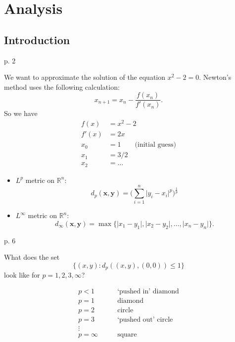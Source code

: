 \chapter{Analysis}

\section{Introduction}

\begin{problem}{p. 2}{}


    We want to approximate the solution of the equation $x^2 - 2 = 0$. Newton's method uses the following calculation:
        $$ x_{n+1} = x_n - \frac{f(x_n)}{f'(x_n)} . $$
    So we have
        \begin{align*}
            f(x) &= x^2 - 2 \\
            f'(x) &= 2x \\
            x_0 &= 1 \qquad \text{(initial guess)} \\
            x_1 &= 3/2 \\
            x_2 &= \ldots
        \end{align*}
\end{problem}

\begin{itemize}
    \item $L^p$ metric on $\mathbb{R}^n$:
        $$ d_p(\mathbf{x}, \mathbf{y})
            = \biggl( \sum_{i = 1}^n 
            \lvert y_i - x_i \rvert^p \biggr)^\frac{1}{p} $$
    \item $L^\infty$ metric on $\mathbb{R}^n$:
        $$ d_\infty(\mathbf{x}, \mathbf{y}) = \max\{ \lvert x_1 - y_1 \rvert,
            \lvert x_2 - y_2 \rvert, \ldots, 
            \lvert x_n - y_n \rvert \} . $$
\end{itemize}

\begin{problem}{p. 6}{}


    What does the set
        $$ \{ (x, y) : d_p((x, y), (0, 0)) \leq 1 \} $$
    look like for $p = 1, 2, 3, \infty$?

    \tcblower

    \begin{align*}
        p < 1 \qquad &\text{`pushed in' diamond} \\
        p = 1 \qquad &\text{diamond} \\
        p = 2 \qquad &\text{circle} \\
        p = 3 \qquad &\text{`pushed out' circle} \\
        \vdots \\
        p = \infty \qquad &\text{square}
    \end{align*}

\end{problem}


